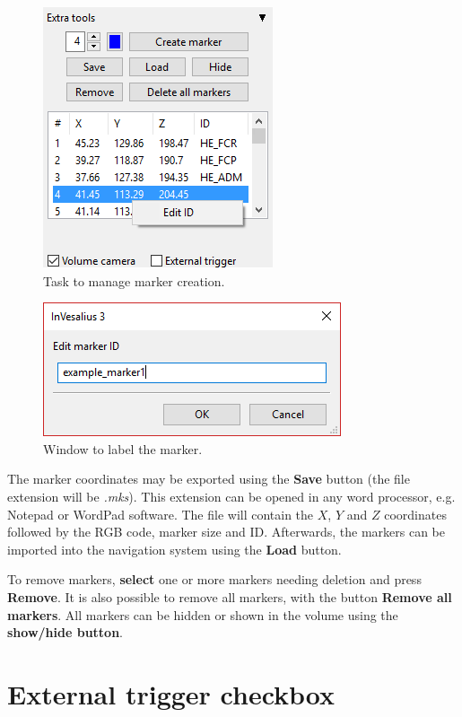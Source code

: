 \begin{figure}[!htb]
\centering
\includegraphics[scale=0.6]{../user_guide_figures/invesalius_screen/nav_id_list_markers_en.png}
\caption{Task to manage marker creation.}
\label{fig:nav_id_list_markers}
\end{figure} 

\begin{figure}[!htb]
\centering
\includegraphics[scale=0.6]{../user_guide_figures/invesalius_screen/nav_edit_id_markers_en.png}
\caption{Window to label the marker.}
\label{fig:nav_edit_id_markers}
\end{figure} 

The marker coordinates may be exported using the \textbf{Save} button (the file extension will be \textit{.mks}). This extension can be opened in any word processor, e.g. Notepad or WordPad software. The file will contain the $X$, $Y$ and $Z$ coordinates followed by the RGB code, marker size and ID. Afterwards, the markers can be imported into the navigation system using the \textbf{Load} button.

To remove markers, \textbf{select} one or more markers needing deletion and press \textbf{Remove}. It is also possible to remove all markers, with the button \textbf{Remove all markers}. All markers can be hidden or shown in the volume using the \textbf{show/hide button}.

\section{External trigger checkbox}

